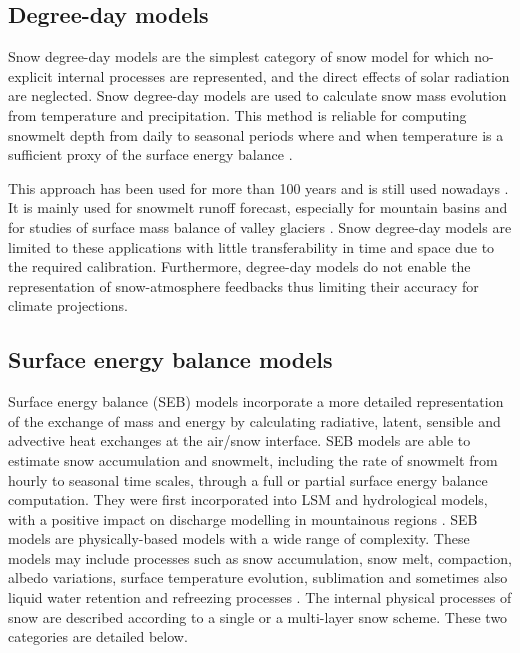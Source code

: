 \documentclass[utf8]{frontiersSCNS} %
\begin{document}
\subsection{Degree-day models}

Snow degree-day models are the simplest category of snow model for which no-explicit internal processes are represented, and the direct effects of solar radiation are neglected. Snow degree-day models are used to calculate snow mass evolution from temperature and precipitation. This method is reliable for computing snowmelt depth from daily to seasonal periods where and when temperature is a sufficient proxy of the surface energy balance \citep{Rango_1995}. %

This approach has been used for more than 100 years \citep{Clyde_1931,Collins_1934} and is still used nowadays \citep{Tobin_2013,Riboust_2019}. It is mainly used for snowmelt runoff forecast, especially for mountain basins and for studies of surface mass balance of valley glaciers \citep{Finsterwalder_1887,Singh_2000,Braithwaite_2008,Reveillet_2017}. Snow degree-day models are limited to these applications with little transferability in time and space due to the required calibration. Furthermore, degree-day models do not enable the representation of snow-atmosphere feedbacks thus limiting their accuracy for climate projections.  


\subsection{Surface energy balance models}

Surface energy balance (SEB) models incorporate a more detailed representation of the exchange of mass and energy by calculating radiative, latent, sensible and advective heat exchanges at the air/snow interface. SEB models are able to estimate snow accumulation and snowmelt, including the rate of snowmelt from hourly to seasonal time scales, through a full or partial surface energy balance computation. They were first incorporated into LSM and hydrological models, with a positive impact on discharge modelling in mountainous regions \citep{Boone_2001}. SEB models are physically-based models with a wide range of complexity. These models may include processes such as snow accumulation, snow melt, compaction, albedo variations, surface temperature evolution, sublimation and sometimes also liquid water retention and refreezing processes \citep{Tarboton_1996,Mahat_2012}. The internal physical processes of snow are described according to a single or a multi-layer snow scheme. These two categories are detailed below.
\end{document}
